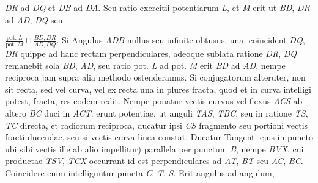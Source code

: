 \textit{DR} ad \textit{DQ} et \textit{DB} ad \textit{DA}. 
Seu ratio exercitii potentiarum \textit{L}, et \textit{M} erit ut \textit{BD}, \textit{DR} ad \textit{AD}, \textit{DQ} seu \rule[-4mm]{0pt}{10mm}$\displaystyle\frac{\text{pot.}\; L}{\text{pot.}\; M}\sqcap\displaystyle\frac{BD, DR}{AD, DQ}$.
\pend
\pstart
Si Angulus \textit{ADB} nullus seu infinite obtusus, 
una, coincident \textit{DQ}, \textit{DR} quippe ad hanc rectam perpendiculares,
adeoque sublata ratione \textit{DR}, \textit{DQ} remanebit sola \textit{BD}, \textit{AD}, seu ratio pot. \textit{L} ad pot. \textit{M} erit \textit{BD} ad \textit{AD}, nempe reciproca
jam supra alia methodo ostenderamus.
\pend
\pstart
Si
conjugatorum alteruter,
non sit
recta, sed vel curva, vel ex recta una in plures fracta, quod et in curva intelligi potest,
fracta, res eodem redit. Nempe ponatur vectis curvus vel flexus \textit{ACS} ab altero \textit{BC} duci in \textit{ACT}. erunt potentiae, ut anguli \textit{TAS}, \textit{TBC}, seu in ratione \textit{TS}, \textit{TC} directa, et radiorum reciproca, ducatur ipsi \textit{CS} fragmento seu portioni vectis fracti ducendae, seu si vectis curva linea constat. Ducatur Tangenti ejus
in puncto ubi sibi vectis ille ab alio impellitur) parallela per punctum \textit{B}, nempe \textit{BVX}, cui productae \textit{TSV}, \textit{TCX} occurrant\bracks{,} id est perpendiculares ad \textit{AT}, \textit{BT} seu \textit{AC}, \textit{BC}. Coincidere enim intelliguntur puncta \textit{C}, \textit{T}, \textit{S}. Erit angulus ad angulum, 

